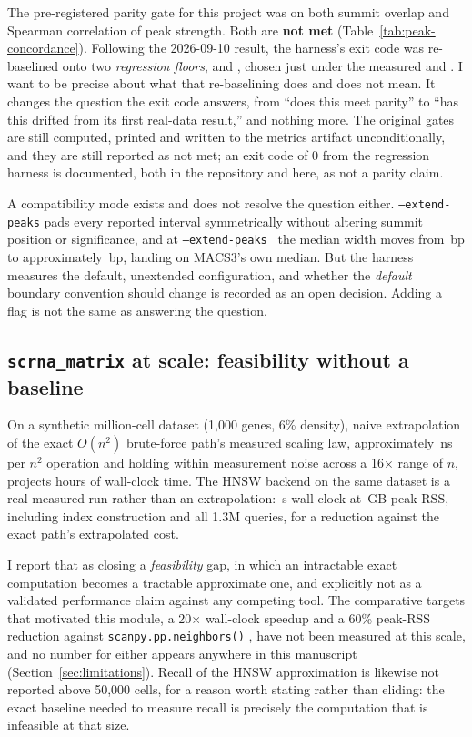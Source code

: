 \documentclass[10pt,twocolumn]{article}
\begin{document}
The pre-registered parity gate for this project was \ParityGate{} on both
summit overlap and Spearman correlation of peak strength. Both are
\textbf{not met} (Table~\ref{tab:peak-concordance}). Following the 2026-09-10
result, the harness's exit code was re-baselined onto two \emph{regression
floors}, \SummitFloor{} and \SpearmanFloor{}, chosen just under the measured
\SummitOverlapRate{} and \SpearmanLogP{}. I want to be precise about what
that re-baselining does and does not mean. It changes the question the exit
code answers, from ``does this meet parity'' to ``has this drifted from its
first real-data result,'' and nothing more. The original \ParityGate{} gates
are still computed, printed and written to the metrics artifact
unconditionally, and they are still reported as not met; an exit code of 0
from the regression harness is documented, both in the repository and here,
as not a parity claim.

A compatibility mode exists and does not resolve the question either.
\texttt{--extend-peaks} pads every reported interval symmetrically without
altering summit position or significance, and at
\texttt{--extend-peaks}~\ExtendPeaksDemo{} the median width moves from
\PtoMedianWidth{}\,bp to approximately \ExtendPeaksMedianWidth{}\,bp, landing
on MACS3's own median. But the harness measures the default, unextended
configuration, and whether the \emph{default} boundary convention should
change is recorded as an open decision. Adding a flag is not the same as
answering the question.

\subsection{\texttt{scrna\_matrix} at scale: feasibility without a baseline}

On a synthetic \ScrnaCells{} million-cell dataset (1,000 genes, 6\% density),
naive extrapolation of the exact $O(n^2)$ brute-force path's measured scaling
law, approximately \ScrnaExactNsPerNSq{}\,ns per $n^2$ operation and holding
within measurement noise across a 16$\times$ range of $n$, projects
\ScrnaExtrapolatedHours{} hours of wall-clock time. The HNSW backend on the
same dataset is a real measured run rather than an extrapolation:
\ScrnaHnswWall{}\,s wall-clock at \ScrnaHnswRss{}\,GB peak RSS, including
index construction and all 1.3M queries, for a \ScrnaProjectedSpeedup{}
reduction against the exact path's extrapolated cost.

I report that as closing a \emph{feasibility} gap, in which an intractable
exact computation becomes a tractable approximate one, and explicitly not as
a validated performance claim against any competing tool. The comparative
targets that motivated this module, a 20$\times$ wall-clock speedup and a 60\%
peak-RSS reduction against \texttt{scanpy.pp.neighbors()}
\citep{wolf2018scanpy}, have not been measured at this scale, and no number
for either appears anywhere in this manuscript
(Section~\ref{sec:limitations}). Recall of the HNSW approximation is likewise
not reported above 50,000 cells, for a reason worth stating rather than
eliding: the exact baseline needed to measure recall is precisely the
computation that is infeasible at that size.
\end{document}
